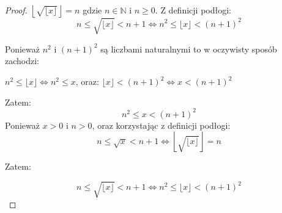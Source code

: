 \documentclass[svgnames]{article}
\begin{document}
\begin{proof}
$ \left\lfloor \sqrt{ \lfloor x \rfloor} \right\rfloor = n $ gdzie $ n \in \mathbb{N} $ i $ n \geq 0 $. 
Z definicji podłogi: 
$$ n \leq \sqrt{ \lfloor x \rfloor} < n+1 \Leftrightarrow n^2 \leq \lfloor x \rfloor < (n+1)^2 $$

Ponieważ $n^2$ i $(n+1)^2$ są liczbami naturalnymi to w oczywisty sposób zachodzi:

$ n^2 \leq \lfloor x \rfloor \Leftrightarrow n^2 \leq x $, oraz:
$ \lfloor x \rfloor < (n+1)^2 \Leftrightarrow x <  (n+1)^2$

Zatem:
$$  n^2 \leq x <  (n+1)^2 $$
Ponieważ $x > 0$ i $n > 0$, oraz korzystając z definicji podłogi:
$$  n \leq \sqrt{x} <  n+1 \Leftrightarrow  \left\lfloor \sqrt{ \lfloor x \rfloor} \right\rfloor = n $$

Zatem:

$$ n \leq \sqrt{ \lfloor x \rfloor} < n+1 \Leftrightarrow n^2 \leq \lfloor x \rfloor < (n+1)^2 $$

\end{proof}

\subsection{}%
\end{document}
